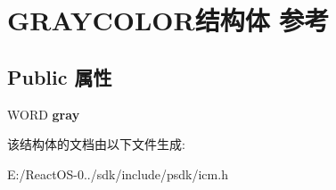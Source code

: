 \hypertarget{struct_g_r_a_y_c_o_l_o_r}{}\section{G\+R\+A\+Y\+C\+O\+L\+O\+R结构体 参考}
\label{struct_g_r_a_y_c_o_l_o_r}
\subsection*{Public 属性}
\begin{DoxyCompactItemize}
\item 
\mbox{\label{struct_g_r_a_y_c_o_l_o_r_a49206348ef7d47db56d7ad5c626efcaf}} 
W\+O\+RD {\bfseries gray}
\end{DoxyCompactItemize}


该结构体的文档由以下文件生成\+:\begin{DoxyCompactItemize}
\item 
E\+:/\+React\+O\+S-\/0../sdk/include/psdk/icm.\+h\end{DoxyCompactItemize}
